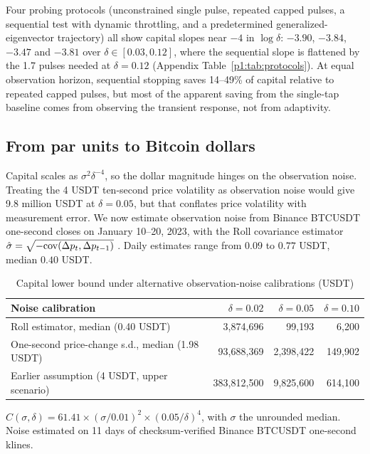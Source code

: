Four probing protocols (unconstrained single pulse, repeated capped pulses, a sequential test with dynamic throttling, and a predetermined generalized-eigenvector trajectory) all show capital slopes near $-4$ in $\log\delta$: $-3.90$, $-3.84$, $-3.47$ and $-3.81$ over $\delta\in[0.03,0.12]$, where the sequential slope is flattened by the 1.7 pulses needed at $\delta=0.12$ (Appendix Table~\ref{p1:tab:protocols}). At equal observation horizon, sequential stopping saves 14--49\% of capital relative to repeated capped pulses, but most of the apparent saving from the single-tap baseline comes from observing the transient response, not from adaptivity.

\subsection{From par units to Bitcoin dollars}\label{p1:sec:dollars}

Capital scales as $\sigma^2\delta^{-4}$, so the dollar magnitude hinges on the observation noise. Treating the 4 USDT ten-second price volatility as observation noise would give 9.8 million USDT at $\delta=0.05$, but that conflates price volatility with measurement error. We now estimate observation noise from Binance BTCUSDT one-second closes on January 10--20, 2023, with the Roll covariance estimator $\hat\sigma=\sqrt{-{\rm cov}(\Delta p_t,\Delta p_{t-1})}$ \citep{p1:roll1984}. Daily estimates range from $0.09$ to $0.77$ USDT, median $0.40$ USDT.

\begin{table}[t]\centering
\begin{threeparttable}
\caption{Capital lower bound under alternative observation-noise calibrations (USDT)}\label{p1:tab:capital}
\begin{tabular}{lrrr}
\toprule
Noise calibration & $\delta=0.02$ & $\delta=0.05$ & $\delta=0.10$\\
\midrule
Roll estimator, median (0.40 USDT) & 3{,}874{,}696 & 99{,}193 & 6{,}200\\
One-second price-change s.d., median (1.98 USDT) & 93{,}688{,}369 & 2{,}398{,}422 & 149{,}902\\
Earlier assumption (4 USDT, upper scenario) & 383{,}812{,}500 & 9{,}825{,}600 & 614{,}100\\
\bottomrule
\end{tabular}
\begin{tablenotes}\footnotesize
\item $C(\sigma,\delta)=61.41\times(\sigma/0.01)^2\times(0.05/\delta)^4$, with $\sigma$ the unrounded median. Noise estimated on 11 days of checksum-verified Binance BTCUSDT one-second klines. \end{tablenotes}
\end{threeparttable}
\end{table}

